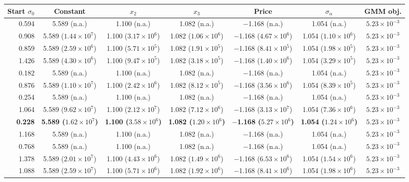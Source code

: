 \begin{tabular}{rcccccc}
\toprule
Start $\sigma_0$ & Constant & $x_2$ & $x_3$ & Price & $\sigma_\alpha$ & GMM obj. \\
\midrule
0.594 & 5.589 (n.a.) & 1.100 (n.a.) & 1.082 (n.a.) & $-$1.168 (n.a.) & 1.054 (n.a.) & $5.23\times10^{-3}$ \\
0.908 & 5.589 ($1.44\times10^{7}$) & 1.100 ($3.17\times10^{6}$) & 1.082 ($1.06\times10^{6}$) & $-$1.168 ($4.67\times10^{6}$) & 1.054 ($1.10\times10^{6}$) & $5.23\times10^{-3}$ \\
0.859 & 5.589 ($2.59\times10^{6}$) & 1.100 ($5.71\times10^{5}$) & 1.082 ($1.91\times10^{5}$) & $-$1.168 ($8.41\times10^{5}$) & 1.054 ($1.98\times10^{5}$) & $5.23\times10^{-3}$ \\
1.426 & 5.589 ($4.30\times10^{6}$) & 1.100 ($9.47\times10^{5}$) & 1.082 ($3.18\times10^{5}$) & $-$1.168 ($1.40\times10^{6}$) & 1.054 ($3.29\times10^{5}$) & $5.23\times10^{-3}$ \\
0.182 & 5.589 (n.a.) & 1.100 (n.a.) & 1.082 (n.a.) & $-$1.168 (n.a.) & 1.054 (n.a.) & $5.23\times10^{-3}$ \\
0.876 & 5.589 ($1.10\times10^{7}$) & 1.100 ($2.42\times10^{6}$) & 1.082 ($8.12\times10^{5}$) & $-$1.168 ($3.56\times10^{6}$) & 1.054 ($8.39\times10^{5}$) & $5.23\times10^{-3}$ \\
0.254 & 5.589 (n.a.) & 1.100 (n.a.) & 1.082 (n.a.) & $-$1.168 (n.a.) & 1.054 (n.a.) & $5.23\times10^{-3}$ \\
1.064 & 5.589 ($9.62\times10^{7}$) & 1.100 ($2.12\times10^{7}$) & 1.082 ($7.12\times10^{6}$) & $-$1.168 ($3.13\times10^{7}$) & 1.054 ($7.36\times10^{6}$) & $5.23\times10^{-3}$ \\
\textbf{0.228} & \textbf{5.589 ($1.62\times10^{7}$)} & \textbf{1.100 ($3.58\times10^{6}$)} & \textbf{1.082 ($1.20\times10^{6}$)} & \textbf{$-$1.168 ($5.27\times10^{6}$)} & \textbf{1.054 ($1.24\times10^{6}$)} & \textbf{$5.23\times10^{-3}$} \\
1.168 & 5.589 (n.a.) & 1.100 (n.a.) & 1.082 (n.a.) & $-$1.168 (n.a.) & 1.054 (n.a.) & $5.23\times10^{-3}$ \\
0.768 & 5.589 (n.a.) & 1.100 (n.a.) & 1.082 (n.a.) & $-$1.168 (n.a.) & 1.054 (n.a.) & $5.23\times10^{-3}$ \\
1.378 & 5.589 ($2.01\times10^{7}$) & 1.100 ($4.43\times10^{6}$) & 1.082 ($1.49\times10^{6}$) & $-$1.168 ($6.53\times10^{6}$) & 1.054 ($1.54\times10^{6}$) & $5.23\times10^{-3}$ \\
1.088 & 5.589 ($2.59\times10^{7}$) & 1.100 ($5.71\times10^{6}$) & 1.082 ($1.92\times10^{6}$) & $-$1.168 ($8.41\times10^{6}$) & 1.054 ($1.98\times10^{6}$) & $5.23\times10^{-3}$ \\

\end{tabular}
